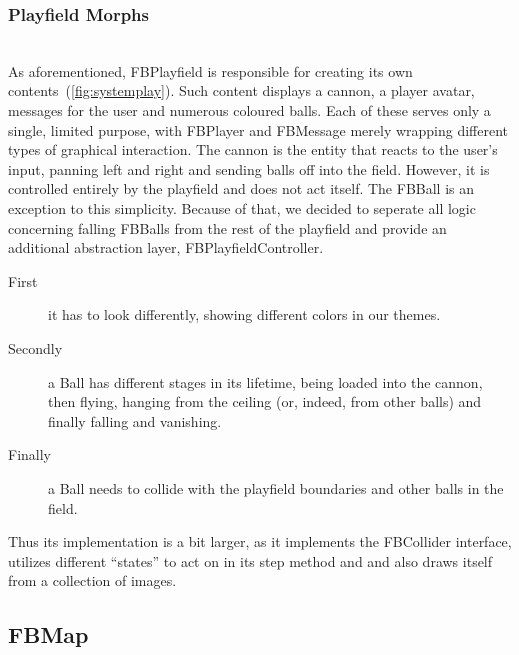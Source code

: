 \subsubsection{Playfield Morphs}~\\
As aforementioned, FBPlayfield is responsible for creating its own 
contents~(\ref{fig:systemplay}). Such content displays a cannon, a 
player avatar, messages for the user and numerous coloured balls. 
Each of these serves only a single, limited purpose, with FBPlayer 
and FBMessage merely wrapping different types of graphical interaction.
The cannon is the entity that reacts to the user's input, panning 
left and right and sending balls off into the field. However, it 
is controlled entirely by the playfield and does not act itself. 
The FBBall is an exception to this simplicity. 
Because of that, we decided to seperate all logic concerning falling
FBBalls from the rest of the playfield and provide an additional
abstraction layer, FBPlayfieldController.


\begin{description}
  \item[First]
    	it has to look 
	differently, showing different colors in our themes. 
  \item[Secondly]
    	a Ball has different stages in its lifetime, being 
	loaded into the cannon, then flying, hanging from the 
	ceiling (or, indeed, from other balls) and finally falling 
	and vanishing.
  \item[Finally]
    	a Ball needs to collide with the playfield boundaries and 
	other balls in the field.
\end{description}
Thus its implementation is a bit larger, as it implements the FBCollider 
interface, utilizes different ``states'' to act on in its step method and 
and also draws itself from a collection of images.
%
\subsection{FBMap}
